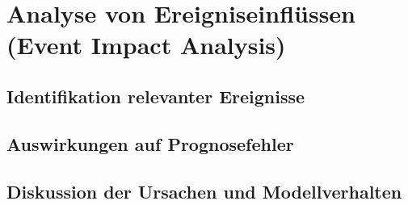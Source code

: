 \newpage

\section{Analyse von Ereigniseinflüssen (Event Impact Analysis)}
\label{sec:event-impact}

\subsection{Identifikation relevanter Ereignisse}
\label{subsec:ereignisse}

\subsection{Auswirkungen auf Prognosefehler}
\label{subsec:auswirkungen}

\subsection{Diskussion der Ursachen und Modellverhalten}
\label{subsec:diskussion-ereignisse}